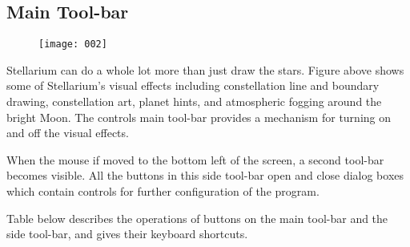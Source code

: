\subsection{Main Tool-bar}\label{main-tool-bar}

\begin{figure}[h]
\centering\texttt{[image: 002]}
\end{figure}

Stellarium can do a whole lot more than just draw the stars. Figure
above shows some of Stellarium's visual effects including constellation
line and boundary drawing, constellation art, planet hints, and
atmospheric fogging around the bright Moon. The controls main tool-bar
provides a mechanism for turning on and off the visual effects.

When the mouse if moved to the bottom left of the screen, a second
tool-bar becomes visible. All the buttons in this side tool-bar open and
close dialog boxes which contain controls for further configuration of
the program.

Table below describes the operations of buttons on the main tool-bar and
the side tool-bar, and gives their keyboard shortcuts.

